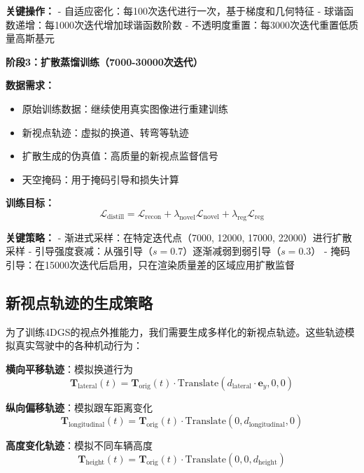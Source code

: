 \textbf{关键操作：}
- 自适应密化：每100次迭代进行一次，基于梯度和几何特征
- 球谐函数递增：每1000次迭代增加球谐函数阶数
- 不透明度重置：每3000次迭代重置低质量高斯基元

\textbf{阶段3：扩散蒸馏训练（7000-30000次迭代）}

\textbf{数据需求：}
\begin{itemize}
\item 原始训练数据：继续使用真实图像进行重建训练
\item 新视点轨迹：虚拟的换道、转弯等轨迹
\item 扩散生成的伪真值：高质量的新视点监督信号
\item 天空掩码：用于掩码引导和损失计算
\end{itemize}

\textbf{训练目标：}
\begin{equation}
\mathcal{L}_{\text{distill}} = \mathcal{L}_{\text{recon}} + \lambda_{\text{novel}} \mathcal{L}_{\text{novel}} + \lambda_{\text{reg}} \mathcal{L}_{\text{reg}}
\label{eq:distillation_training}
\end{equation}

\textbf{关键策略：}
- 渐进式采样：在特定迭代点（7000, 12000, 17000, 22000）进行扩散采样
- 引导强度衰减：从强引导（$s=0.7$）逐渐减弱到弱引导（$s=0.3$）
- 掩码引导：在15000次迭代后启用，只在渲染质量差的区域应用扩散监督

\subsection{新视点轨迹的生成策略}

为了训练4DGS的视点外推能力，我们需要生成多样化的新视点轨迹。这些轨迹模拟真实驾驶中的各种机动行为：

\textbf{横向平移轨迹}：模拟换道行为
\begin{equation}
\mathbf{T}_{\text{lateral}}(t) = \mathbf{T}_{\text{orig}}(t) \cdot \text{Translate}(d_{\text{lateral}} \cdot \mathbf{e}_y, 0, 0)
\label{eq:lateral_trajectory}
\end{equation}

\textbf{纵向偏移轨迹}：模拟跟车距离变化
\begin{equation}
\mathbf{T}_{\text{longitudinal}}(t) = \mathbf{T}_{\text{orig}}(t) \cdot \text{Translate}(0, d_{\text{longitudinal}}, 0)
\label{eq:longitudinal_trajectory}
\end{equation}

\textbf{高度变化轨迹}：模拟不同车辆高度
\begin{equation}
\mathbf{T}_{\text{height}}(t) = \mathbf{T}_{\text{orig}}(t) \cdot \text{Translate}(0, 0, d_{\text{height}})
\label{eq:height_trajectory}
\end{equation}

